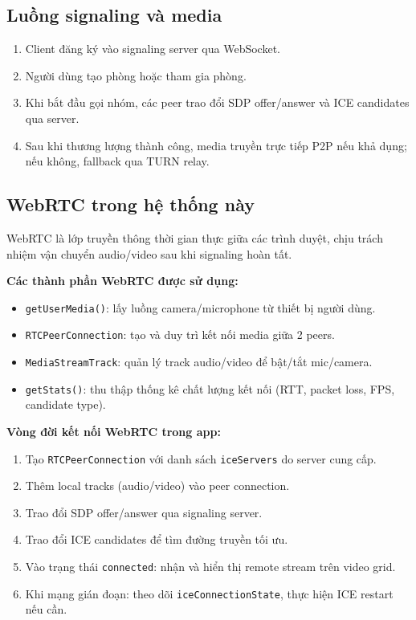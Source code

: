 \documentclass[12pt,a4paper]{article}
\begin{document}
\subsection{Luồng signaling và media}
\begin{enumerate}[leftmargin=1.8em]
  \item Client đăng ký vào signaling server qua WebSocket.
  \item Người dùng tạo phòng hoặc tham gia phòng.
  \item Khi bắt đầu gọi nhóm, các peer trao đổi SDP offer/answer và ICE candidates qua server.
  \item Sau khi thương lượng thành công, media truyền trực tiếp P2P nếu khả dụng; nếu không, fallback qua TURN relay.
\end{enumerate}

\subsection{WebRTC trong hệ thống này}
WebRTC là lớp truyền thông thời gian thực giữa các trình duyệt, chịu trách nhiệm vận chuyển audio/video sau khi signaling hoàn tất.

\textbf{Các thành phần WebRTC được sử dụng:}
\begin{itemize}[leftmargin=1.5em]
  \item \texttt{getUserMedia()}: lấy luồng camera/microphone từ thiết bị người dùng.
  \item \texttt{RTCPeerConnection}: tạo và duy trì kết nối media giữa 2 peers.
  \item \texttt{MediaStreamTrack}: quản lý track audio/video để bật/tắt mic/camera.
  \item \texttt{getStats()}: thu thập thống kê chất lượng kết nối (RTT, packet loss, FPS, candidate type).
\end{itemize}

\textbf{Vòng đời kết nối WebRTC trong app:}
\begin{enumerate}[leftmargin=1.8em]
  \item Tạo \texttt{RTCPeerConnection} với danh sách \texttt{iceServers} do server cung cấp.
  \item Thêm local tracks (audio/video) vào peer connection.
  \item Trao đổi SDP offer/answer qua signaling server.
  \item Trao đổi ICE candidates để tìm đường truyền tối ưu.
  \item Vào trạng thái \texttt{connected}: nhận và hiển thị remote stream trên video grid.
  \item Khi mạng gián đoạn: theo dõi \texttt{iceConnectionState}, thực hiện ICE restart nếu cần.
\end{enumerate}
\end{document}
